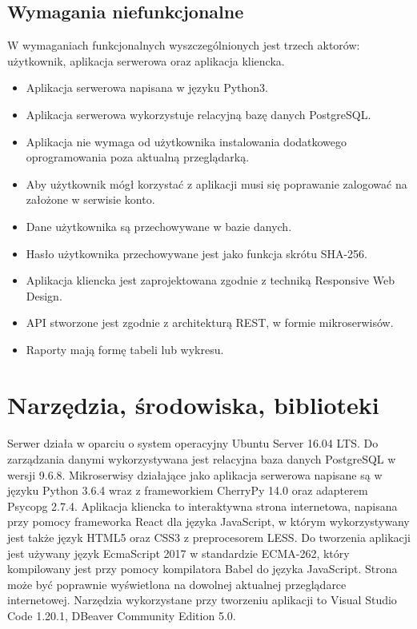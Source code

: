 \documentclass{article}
\begin{document}
	\subsection{Wymagania niefunkcjonalne}
	W wymaganiach funkcjonalnych wyszczególnionych jest trzech aktorów: użytkownik, aplikacja serwerowa oraz aplikacja kliencka.
	\begin{itemize}
		\item Aplikacja serwerowa napisana w języku Python3.
		\item Aplikacja serwerowa wykorzystuje relacyjną bazę danych PostgreSQL.
		\item Aplikacja nie wymaga od użytkownika instalowania dodatkowego oprogramowania poza aktualną przeglądarką.
		\item Aby użytkownik mógł korzystać z aplikacji musi się poprawanie zalogować na założone w serwisie konto.
		\item Dane użytkownika są przechowywane w bazie danych.
		\item Hasło użytkownika przechowywane jest jako funkcja skrótu SHA-256.
		\item Aplikacja kliencka jest zaprojektowana zgodnie z techniką Responsive Web Design.
		\item API stworzone jest zgodnie z architekturą REST, w formie mikroserwisów.
		\item Raporty mają formę tabeli lub wykresu.
	\end{itemize}
	\section{Narzędzia, środowiska, biblioteki}
	\paragraph{}Serwer działa w oparciu o system operacyjny Ubuntu Server 16.04 LTS.
	Do zarządzania danymi wykorzystywana jest relacyjna baza danych PostgreSQL w wersji 9.6.8.
	Mikroserwisy działające jako aplikacja serwerowa napisane są w języku Python 3.6.4 wraz z frameworkiem CherryPy 14.0 oraz adapterem Psycopg 2.7.4.
	Aplikacja kliencka to interaktywna strona internetowa, napisana przy pomocy frameworka React dla języka JavaScript, w którym wykorzystywany jest także język HTML5 oraz CSS3 z preprocesorem LESS. Do tworzenia aplikacji jest używany język EcmaScript 2017 w standardzie ECMA-262, który kompilowany jest przy pomocy kompilatora Babel do języka JavaScript. Strona może być poprawnie wyświetlona na dowolnej aktualnej przeglądarce internetowej.
	Narzędzia wykorzystane przy tworzeniu aplikacji to Visual Studio Code 1.20.1, DBeaver Community Edition 5.0.
\end{document}
